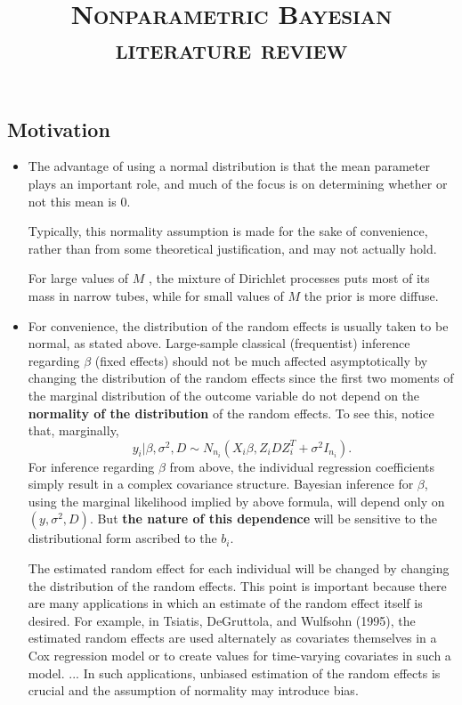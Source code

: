 \documentclass{article}
\begin{document}
\title{\textsc{Nonparametric Bayesian literature review}}
\date{}
\maketitle

\subsection*{Motivation}
\begin{itemize}

\item \cite{burr2005bayesian} The advantage of using a normal distribution is that the mean parameter plays an important role, and much of the focus is on determining whether or not this mean is 0. \par

Typically, this normality assumption is made for the sake of convenience, rather than from some theoretical justification, and may not actually hold. \par 

For large values of $M$ , the mixture of Dirichlet processes puts most of its mass in narrow tubes, while for small values of $M$ the prior is more diffuse.

\item \cite{kleinman1998semiparametric} For convenience, the distribution of the random effects is usually taken to be normal, as stated above. Large-sample classical (frequentist) inference regarding $\beta$ (fixed effects) should not be much affected asymptotically by changing the distribution of the random effects since the first two moments of the marginal distribution of the outcome variable do not depend on the {\bf normality of the distribution} of the random effects. To see this, notice that, marginally, 
\[y_i|\beta, \sigma^2, D\sim N_{n_i}(X_i\beta, Z_iDZ_i^T+\sigma^2I_{n_i}).\]
For inference regarding $\beta$ from above, the individual regression coefficients simply result in a complex covariance structure. Bayesian inference for $\beta$, using the marginal likelihood implied by above formula, will depend only on $(y, \sigma^2, D)$. But {\bf the nature of this dependence} will be sensitive to the distributional form ascribed to the $b_i$.\par 

The estimated random effect for each individual will be changed by changing the distribution of the random effects. This point is important because there are many applications in which an estimate of the random effect itself is desired. For example, in Tsiatis, DeGruttola, and Wulfsohn (1995), the estimated random effects are used alternately as covariates themselves in a Cox regression model or to create values for time-varying covariates in such a model. ... In such applications, unbiased estimation of the random effects is crucial and the assumption of normality may introduce bias.\par 


\end{itemize}
\end{document}
